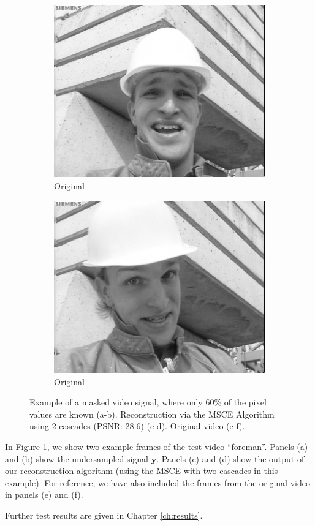 \begin{figure}
\begin{subfigure}{0.4\textwidth}
    \includegraphics[width=\textwidth]{Chapter5/Images/foreman_orig_21.png}
    \caption{Original}
  \end{subfigure}
  \begin{subfigure}{0.4\textwidth}
    \includegraphics[width=\textwidth]{Chapter5/Images/foreman_orig_151.png}
    \caption{Original}
  \end{subfigure}
  \caption[Example output of our video interpolator]{Example of a masked video signal, where only 60\% of the pixel values are known (a-b). 
    Reconstruction via the MSCE Algorithm using 2 cascades (PSNR: 28.6) (c-d).
    Original video (e-f).}
  \label{fig:foreman_masked}
\end{figure}

In Figure \ref{fig:foreman_masked}, we show two example frames of the test video ``foreman''.
Panels (a) and (b) show the undersampled signal $\bm y$.
Panels (c) and (d) show the output of our reconstruction algorithm (using the MSCE with two cascades in this example).
For reference, we have also included the frames from the original video in panels (e) and (f).

Further test results are given in Chapter \ref{ch:results}.

